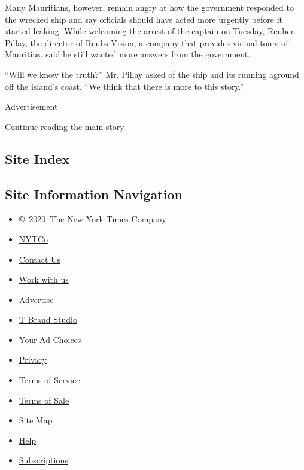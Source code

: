 Many Mauritians, however, remain angry at how the government responded
to the wrecked ship and say officials should have acted more urgently
before it started leaking. While welcoming the arrest of the captain on
Tuesday, Reuben Pillay, the director of
\href{http://reubsvision.mu/Mauritius360.html}{Reubs Vision}, a company
that provides virtual tours of Mauritius, said he still wanted more
answers from the government.

``Will we know the truth?'' Mr. Pillay asked of the ship and its running
aground off the island's coast. ``We think that there is more to this
story.''

Advertisement

\protect\hyperlink{after-bottom}{Continue reading the main story}

\hypertarget{site-index}{%
\subsection{Site Index}\label{site-index}}

\hypertarget{site-information-navigation}{%
\subsection{Site Information
Navigation}\label{site-information-navigation}}

\begin{itemize}
\tightlist
\item
  \href{https://help.nytimes3xbfgragh.onion/hc/en-us/articles/115014792127-Copyright-notice}{©~2020~The
  New York Times Company}
\end{itemize}

\begin{itemize}
\tightlist
\item
  \href{https://www.nytco.com/}{NYTCo}
\item
  \href{https://help.nytimes3xbfgragh.onion/hc/en-us/articles/115015385887-Contact-Us}{Contact
  Us}
\item
  \href{https://www.nytco.com/careers/}{Work with us}
\item
  \href{https://nytmediakit.com/}{Advertise}
\item
  \href{http://www.tbrandstudio.com/}{T Brand Studio}
\item
  \href{https://www.nytimes3xbfgragh.onion/privacy/cookie-policy\#how-do-i-manage-trackers}{Your
  Ad Choices}
\item
  \href{https://www.nytimes3xbfgragh.onion/privacy}{Privacy}
\item
  \href{https://help.nytimes3xbfgragh.onion/hc/en-us/articles/115014893428-Terms-of-service}{Terms
  of Service}
\item
  \href{https://help.nytimes3xbfgragh.onion/hc/en-us/articles/115014893968-Terms-of-sale}{Terms
  of Sale}
\item
  \href{https://spiderbites.nytimes3xbfgragh.onion}{Site Map}
\item
  \href{https://help.nytimes3xbfgragh.onion/hc/en-us}{Help}
\item
  \href{https://www.nytimes3xbfgragh.onion/subscription?campaignId=37WXW}{Subscriptions}
\end{itemize}
